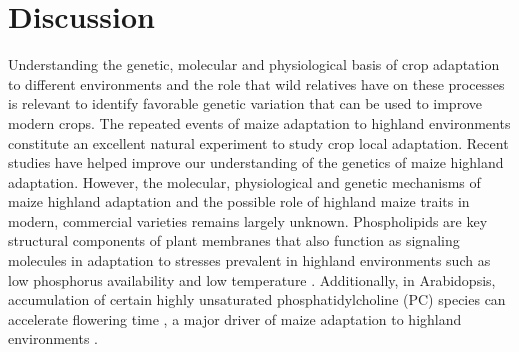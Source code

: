 \documentclass[9pt,twocolumn,twoside,lineno]{BioRxiv}
\begin{document}
 \section{Discussion}
\label{sec:discussion}
Understanding the genetic, molecular and  physiological basis of crop adaptation to different environments and the role that wild relatives have on these processes is relevant to identify favorable genetic variation that can be used to improve modern crops.
The repeated events of maize adaptation to highland environments constitute an excellent natural experiment to study crop local adaptation. 
Recent studies \cite{Wang2020-mp, Takuno2015-uj, Crow2020-gene} have helped improve our understanding of the genetics of maize highland adaptation. However, the molecular, physiological and genetic mechanisms of maize highland adaptation and the possible role of highland maize traits in modern, commercial varieties remains largely unknown.
Phospholipids are key structural components of plant membranes that also function as signaling molecules in adaptation to stresses prevalent in highland environments \cite{Ryu2004-iv, Nakamura2017-vb} such as low phosphorus availability \cite{Veneklaas2012-ls, Cruz-Ramirez2004-ib, Lambers2012-an} and low temperature \cite{Degenkolbe2012-wf, Welti2002-uk, Marla2017-ph}. 
Additionally, in Arabidopsis, accumulation of certain highly unsaturated phosphatidylcholine (PC) species can accelerate flowering time \cite{Nakamura2014-qf}, a major driver of maize adaptation to highland environments \cite{Romero_Navarro2017-cn, Gates2019-xu}.
 
\end{document}

